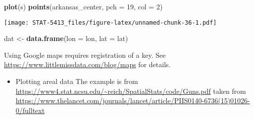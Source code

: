 \documentclass[]{book}
\newenvironment{Shaded}{\begin{snugshade}}{\end{snugshade}}
\newcommand{\DataTypeTok}[1]{\textcolor[rgb]{0.13,0.29,0.53}{#1}}
\newcommand{\DecValTok}[1]{\textcolor[rgb]{0.00,0.00,0.81}{#1}}
\newcommand{\KeywordTok}[1]{\textcolor[rgb]{0.13,0.29,0.53}{\textbf{#1}}}
\newcommand{\NormalTok}[1]{#1}
\newcommand{\StringTok}[1]{\textcolor[rgb]{0.31,0.60,0.02}{#1}}
\providecommand{\tightlist}{%
  \setlength{\itemsep}{0pt}\setlength{\parskip}{0pt}}
\begin{document}
\begin{Shaded}
\begin{Highlighting}[]
\KeywordTok{plot}\NormalTok{(s)}
\KeywordTok{points}\NormalTok{(arkansas_center, }\DataTypeTok{pch =} \DecValTok{19}\NormalTok{, }\DataTypeTok{col =} \DecValTok{2}\NormalTok{)}
\end{Highlighting}
\end{Shaded}

\texttt{[image: STAT-5413\_files/figure-latex/unnamed-chunk-36-1.pdf]}

\begin{Shaded}
\begin{Highlighting}[]
\NormalTok{dat <-}\StringTok{ }\KeywordTok{data.frame}\NormalTok{(}\DataTypeTok{lon =}\NormalTok{ lon, }\DataTypeTok{lat =}\NormalTok{ lat)}
\end{Highlighting}
\end{Shaded}

Using Google maps requires registration of a key. See \url{https://www.littlemissdata.com/blog/maps} for details.

\begin{itemize}
\tightlist
\item
  Plotting areal data
  The example is from \url{https://www4.stat.ncsu.edu/~reich/SpatialStats/code/Guns.pdf} taken from \url{https://www.thelancet.com/journals/lancet/article/PIIS0140-6736(15)01026-0/fulltext}
\end{itemize}
\end{document}
